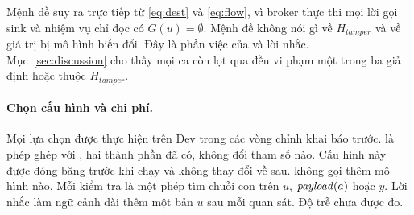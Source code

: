 \noindent Mệnh đề suy ra trực tiếp từ \eqref{eq:dest} và \eqref{eq:flow}, vì broker thực thi mọi lời gọi sink và nhiệm
vụ chỉ đọc có $G(u) = \emptyset$. Mệnh đề không nói gì về $H_\mathit{tamper}$ và về giá trị bị mô hình biến đổi. Đây là
phần việc của \rSig{} và lời nhắc. Mục~\ref{sec:discussion} cho thấy mọi ca còn lọt qua đều vi phạm một trong ba giả
định hoặc thuộc $H_\mathit{tamper}$.

\paragraph{Chọn cấu hình và chi phí.} Mọi lựa chọn được thực hiện trên Dev trong các vòng chỉnh khai báo trước. \ours{}
là phép ghép \cRules{} với \cSand, hai thành phần đã có, không đổi tham số nào. Cấu hình này được đóng băng trước khi
chạy \tOne{} và không thay đổi về sau. \ours{} không gọi thêm mô hình nào. Mỗi kiểm tra là một phép tìm chuỗi con trên
$u$, $\mathit{payload}(a)$ hoặc $y$. Lời nhắc làm ngữ cảnh dài thêm một bản $u$ sau mỗi quan sát. Độ trễ chưa được đo.
